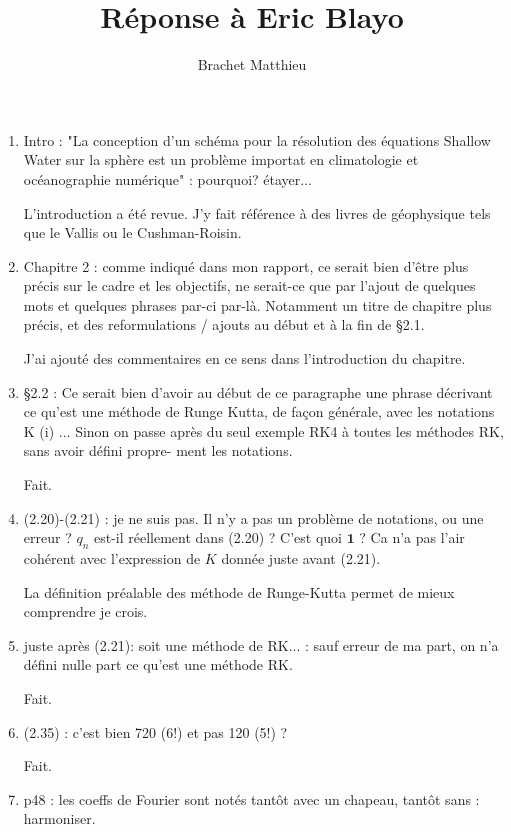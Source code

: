 \documentclass[10pt,a4paper]{article}
\author{Brachet Matthieu}
\title{Réponse à Eric Blayo}
\begin{document}

\begin{enumerate}
\item Intro : "La conception d'un schéma pour la résolution des équations Shallow Water sur la sphère est un problème importat en climatologie et océanographie numérique" : pourquoi? étayer...

{\color{blue} L'introduction a été revue. J'y fait référence à des livres de géophysique tels que le Vallis ou le Cushman-Roisin.} 

\item Chapitre 2 : comme indiqué dans mon rapport, ce serait bien d’être plus précis sur le
cadre et les objectifs, ne serait-ce que par l’ajout de quelques mots et quelques phrases
par-ci par-là. Notamment un titre de chapitre plus précis, et des reformulations /
ajouts au début et à la fin de §2.1.

{\color{blue} J'ai ajouté des commentaires en ce sens dans l'introduction du chapitre.} 

\item §2.2 : Ce serait bien d’avoir au début de ce paragraphe une phrase décrivant ce qu’est
une méthode de Runge Kutta, de façon générale, avec les notations K (i) ... Sinon on
passe après du seul exemple RK4 à toutes les méthodes RK, sans avoir défini propre-
ment les notations.

{\color{blue} Fait.} 


\item (2.20)-(2.21) : je ne suis pas. Il n’y a pas un problème de notations, ou une erreur ? $q_n$
est-il réellement dans (2.20) ? C’est quoi $\mathbf{1}$ ? Ca n’a pas l’air cohérent avec l’expression
de $K$ donnée juste avant (2.21).

{\color{blue} La définition préalable des méthode de Runge-Kutta permet de mieux comprendre je crois.} 


\item juste après (2.21): soit une méthode de RK... : sauf erreur de ma part, on n’a défini nulle part ce qu’est une méthode RK.

{\color{blue} Fait.} 


\item (2.35) : c’est bien 720 (6!) et pas 120 (5!) ?

{\color{blue} Fait.} 

\item p48 : les coeffs de Fourier sont notés tantôt avec un chapeau, tantôt sans : harmoniser.


\end{enumerate}
\end{document}
